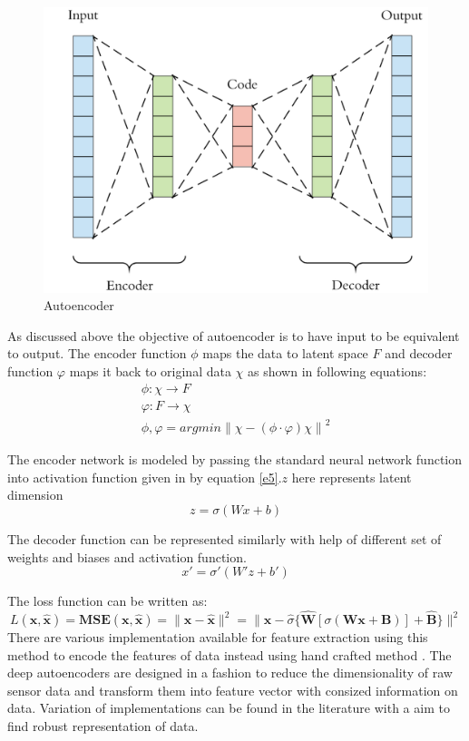      \begin{figure}[h]
     	\centering
     	\includegraphics[width=0.6\linewidth]{images/auto.png}
     	\caption{Autoencoder \cite{auto}}
     	\label{l4}	
     \end{figure}
As discussed above the objective of autoencoder is to have input to be equivalent to output. The encoder function $\phi$ maps the data to latent space $F$ and decoder function $\varphi$ maps it back to original data $\chi$ as shown in following equations:
\begin{gather}
\phi: \chi \to F \\
\varphi : F\to \chi\\
\phi ,\varphi =arg min\left \|\chi -(\phi \cdot \varphi )\chi  \right \|^2
\end{gather}

The encoder network is modeled by passing the standard neural network function into activation function given in by equation \ref{e5}.$z$ here represents latent dimension
\begin{equation}
z=\sigma (Wx+b)
\label{e5}
\end{equation}

The decoder function can be represented similarly with help of different set of weights and biases and activation function.
\begin{equation}
x'= \sigma'(W'z+b')
\label{e6}
\end{equation}

The loss function can be written as:
\begin{equation} 
L(\mathbf{x}, \hat{\mathbf{x}}) = \mathbf{MSE}(\mathbf{x}, \hat{\mathbf{x}}) = \|  \mathbf{x} - \hat{\mathbf{x}} \| ^2 =  \| \mathbf{x} - \hat{\sigma} \{ \hat{\mathbf{W}} \left[\sigma ( \mathbf{W}\mathbf{x} + \mathbf{B} )\right]  + \hat{\mathbf{B}} \} \| ^2 \end{equation}
There are various implementation available for feature extraction using this method to encode the features of data instead using hand crafted method \cite{gerazov2018variational}. The deep autoencoders are designed in a fashion to reduce the dimensionality of raw sensor data \cite{ravi2019current} and transform them into feature vector with consized information on data. Variation of implementations can be found in the literature with a aim to find robust representation of data.
